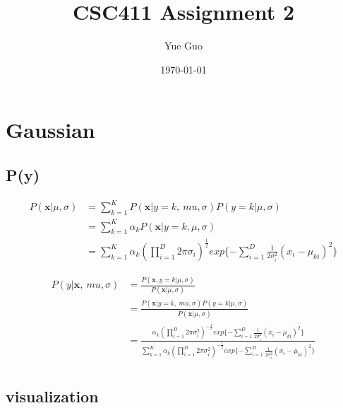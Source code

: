 \documentclass[letterpaper, 12]{article}
\date{\today}
\title{CSC411 Assignment 2}
\author{Yue Guo}
\begin{document}
\maketitle


\section{Gaussian}

\subsection{P(y)}

\begin{equation*}
\begin{split}
P( \bm{x} | \mu ,  \sigma) &= \sum_{k = 1}^{K}  P( \bm{x} | y = k, \ mu ,  \sigma) P(y = k | \mu, \sigma) \\
&=  \sum_{k = 1}^{K} \alpha_{k} P( \bm{x} | y = k, \mu ,  \sigma) \\
&= \sum_{k = 1}^{K} \alpha_{k} (\prod_{i=1}^{D} 2\pi \sigma_{i})^{\frac{1}{2}} exp\{{- \sum_{i=1}^{D}} \frac{1}{2 \sigma_{i} ^2} (x_{i} - \mu_{ki})^2 \} 
\end{split}
\end{equation*}
 
\begin{equation*}
\begin{split}
P(y | \bm{x} , \ mu ,  \sigma) &= \frac{P( \bm{x}, y = k | \mu ,  \sigma)}{P( \bm{x} |  \mu ,  \sigma)}
\\
&= \frac{P( \bm{x} | y = k, \ mu ,  \sigma) P(y = k | \mu ,  \sigma)}{P( \bm{x} |  \mu ,  \sigma)}
\\
&=\frac{ \alpha_{k} (\prod_{i=1}^{D} 2\pi \sigma_{i} ^{2})^{-\frac{1}{2}}  exp\{{- \sum_{i=1}^{D}} \frac{1}
{2 \sigma_{i} ^2} (x_{i} - \mu_{ki})^2 \}  }{\sum_{k=1}^{K} \alpha_{k} (\prod_{i=1}^{D} 2\pi \sigma_{i} ^{2})^{-\frac{1}{2}}  exp\{{- \sum_{i=1}^{D}} \frac{1}
{2 \sigma_{i} ^2} (x_{i} - \mu_{ki})^2 \}} \\
\end{split}
\end{equation*}
\subsection{visualization}
\end{document}
